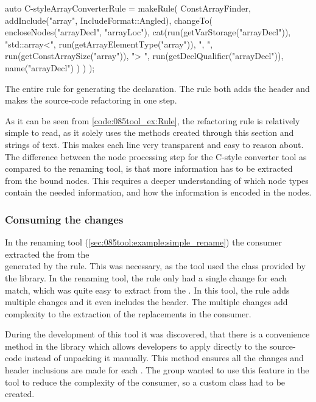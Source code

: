 \begin{listing}[H]
    \begin{cppcode}
auto C-styleArrayConverterRule = makeRule(
    ConstArrayFinder,
    {
        addInclude("array", IncludeFormat::Angled),
        changeTo(
            encloseNodes("arrayDecl", "arrayLoc"),
            cat(run(getVarStorage("arrayDecl")),
                "std::array<",
                run(getArrayElementType("array")),
                ", ",
                run(getConstArraySize("array")),
                "> ",
                run(getDeclQualifier("arrayDecl")),
                name("arrayDecl")
            )
        )
    });
    \end{cppcode}
    \caption{The entire rule for generating the  declaration. The rule both adds the  header and makes the source-code refactoring in one step.}
    \label{code:085tool_ex:Rule}
\end{listing}

As it can be seen from \cref{code:085tool_ex:Rule}, the refactoring rule is relatively simple to read, as it solely uses the methods created through this section and strings of text. This makes each line very transparent and easy to reason about. The difference between the node processing step for the C-style converter tool as compared to the renaming tool, is that more information has to be extracted from the bound nodes. This requires a deeper understanding of which node types contain the needed information, and how the information is encoded in the nodes.


\subsubsection*{Consuming the changes}
In the renaming tool (\cref{sec:085tool:example:simple_rename}) the  consumer extracted the  from the\\
 generated by the rule. This was necessary, as the tool used the  class provided by the library. In the renaming tool, the rule only had a single change for each match, which was quite easy to extract from the . In this tool, the rule adds multiple changes and it even includes the  header. The multiple changes add complexity to the extraction of the replacements in the consumer. 

During the development of this tool it was discovered, that there is a convenience method in the library which allows developers to apply  directly to the source-code instead of unpacking it manually. This method ensures all the changes and header inclusions are made for each . The group wanted to use this feature in the tool to reduce the complexity of the consumer, so a custom  class had to be created.

